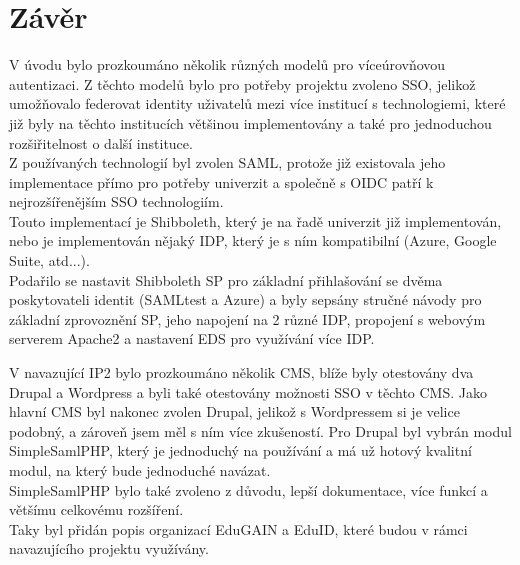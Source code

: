     
    
        


\chapter{Závěr}


V úvodu bylo prozkoumáno několik různých modelů pro víceúrovňovou autentizaci. Z těchto modelů bylo pro potřeby projektu zvoleno SSO, jelikož umožňovalo federovat identity uživatelů mezi více institucí s technologiemi, které již byly na těchto institucích většinou implementovány a také pro jednoduchou rozšiřitelnost o další instituce.
\\
Z používaných technologií byl zvolen SAML, protože již existovala jeho implementace přímo pro potřeby univerzit a společně s OIDC patří k nejrozšířenějším SSO technologiím. \\
Touto implementací je Shibboleth, který je na řadě univerzit již implementován, nebo je implementován nějaký IDP, který je s ním kompatibilní (Azure, Google Suite, atd...).\\
Podařilo se nastavit Shibboleth SP pro základní přihlašování se dvěma poskytovateli identit (SAMLtest a Azure) a byly sepsány stručné návody pro základní zprovoznění SP, jeho napojení na 2 různé IDP, propojení s webovým serverem Apache2 a nastavení EDS pro využívání více IDP.

V navazující IP2 bylo prozkoumáno několik CMS, blíže byly otestovány dva Drupal a Wordpress a byli také otestovány možnosti SSO v těchto CMS. 
Jako hlavní CMS byl nakonec zvolen Drupal, jelikož s Wordpressem si je velice podobný, a zároveň jsem měl s ním více zkušeností. Pro Drupal byl vybrán modul SimpleSamlPHP, který je jednoduchý na používání a má už hotový kvalitní modul, na který bude jednoduché navázat. 
\\
SimpleSamlPHP bylo také zvoleno z důvodu, lepší dokumentace, více funkcí a většímu celkovému rozšíření.
\\
Taky byl přidán popis organizací EduGAIN a EduID, které budou v rámci navazujícího projektu využívány.


\label{zaver}






